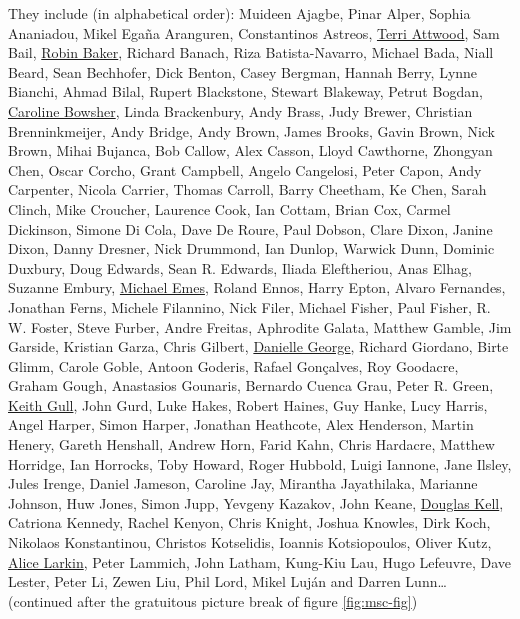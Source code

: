 \documentclass[
]{book}
\begin{document}
They include (in alphabetical order): Muideen Ajagbe, Pinar Alper, Sophia Ananiadou, Mikel Egaña Aranguren, Constantinos Astreos, \href{https://en.wikipedia.org/wiki/Terri_Attwood}{Terri Attwood}, Sam Bail, \href{https://en.wikipedia.org/wiki/Robin_Baker_(biologist)}{Robin Baker}, Richard Banach, Riza Batista-Navarro, Michael Bada, Niall Beard, Sean Bechhofer, Dick Benton, Casey Bergman, Hannah Berry, Lynne Bianchi, Ahmad Bilal, Rupert Blackstone, Stewart Blakeway, Petrut Bogdan, \href{https://www.advance-he.ac.uk/ntfs/professor-caroline-bowsher}{Caroline Bowsher}, Linda Brackenbury, Andy Brass, Judy Brewer, Christian Brenninkmeijer, Andy Bridge, Andy Brown, James Brooks, Gavin Brown, Nick Brown, Mihai Bujanca, Bob Callow, Alex Casson, Lloyd Cawthorne, Zhongyan Chen, Oscar Corcho, Grant Campbell, Angelo Cangelosi, Peter Capon, Andy Carpenter, Nicola Carrier, Thomas Carroll, Barry Cheetham, Ke Chen, Sarah Clinch, Mike Croucher, Laurence Cook, Ian Cottam, Brian Cox, Carmel Dickinson, Simone Di Cola, Dave De Roure, Paul Dobson, Clare Dixon, Janine Dixon, Danny Dresner, Nick Drummond, Ian Dunlop, Warwick Dunn, Dominic Duxbury, Doug Edwards, Sean R. Edwards, Iliada Eleftheriou, Anas Elhag, Suzanne Embury, \href{https://www.uoguelph.ca/mcb/people/dr-michael-j-emes}{Michael Emes}, Roland Ennos, Harry Epton, Alvaro Fernandes, Jonathan Ferns, Michele Filannino, Nick Filer, Michael Fisher, Paul Fisher, R. W. Foster, Steve Furber, Andre Freitas, Aphrodite Galata, Matthew Gamble, Jim Garside, Kristian Garza, Chris Gilbert, \href{https://en.wikipedia.org/wiki/Danielle_George}{Danielle George}, Richard Giordano, Birte Glimm, Carole Goble, Antoon Goderis, Rafael Gonçalves, Roy Goodacre, Graham Gough, Anastasios Gounaris, Bernardo Cuenca Grau, Peter R. Green, \href{https://en.wikipedia.org/wiki/Keith_Gull}{Keith Gull}, John Gurd, Luke Hakes, Robert Haines, Guy Hanke, Lucy Harris, Angel Harper, Simon Harper, Jonathan Heathcote, Alex Henderson, Martin Henery, Gareth Henshall, Andrew Horn, Farid Kahn, Chris Hardacre, Matthew Horridge, Ian Horrocks, Toby Howard, Roger Hubbold, Luigi Iannone, Jane Ilsley, Jules Irenge, Daniel Jameson, Caroline Jay, Mirantha Jayathilaka, Marianne Johnson, Huw Jones, Simon Jupp, Yevgeny Kazakov, John Keane, \href{https://en.wikipedia.org/wiki/Douglas_Kell}{Douglas Kell}, Catriona Kennedy, Rachel Kenyon, Chris Knight, Joshua Knowles, Dirk Koch, Nikolaos Konstantinou, Christos Kotselidis, Ioannis Kotsiopoulos, Oliver Kutz, \href{https://en.wikipedia.org/wiki/Alice_Larkin}{Alice Larkin}, Peter Lammich, John Latham, Kung-Kiu Lau, Hugo Lefeuvre, Dave Lester, Peter Li, Zewen Liu, Phil Lord, Mikel Luján and Darren Lunn\ldots{} (continued after the gratuitous picture break of figure \ref{fig:msc-fig})
\end{document}
